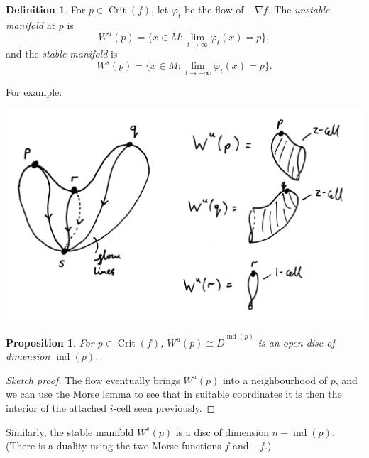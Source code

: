 \documentclass{article}
\newtheorem*{proposition}{Proposition}
\theoremstyle{definition}
\newtheorem*{definition}{Definition}
\DeclareMathOperator{\Crit}{Crit}
\DeclareMathOperator{\ind}{ind}
\begin{document}
\begin{definition}
    For $p\in\Crit(f)$, let $\varphi_t$ be the flow of $-\nabla f$. The
    \emph{unstable manifold} at $p$ is
    \begin{equation*}
        W^u(p) = \{x\in M:\lim_{t\to\infty}\varphi_t(x)=p\},
    \end{equation*}
    and the \emph{stable manifold} is
    \begin{equation*}
        W^s(p) = \{x\in M:\lim_{t\to-\infty}\varphi_t(x)=p\}.
    \end{equation*}
\end{definition}

For example:

\begin{center}
    \includegraphics[scale=0.1]{morse_unstable}
\end{center}

\begin{proposition}
    For $p\in\Crit(f)$, $W^u(p)\cong\mathring D^{\ind(p)}$ is an open disc of
    dimension $\ind(p)$.
\end{proposition}

\begin{proof}[Sketch proof]
    The flow eventually brings $W^u(p)$ into a neighbourhood of $p$, and we can
    use the Morse lemma to see that in suitable coordinates it is then the
    interior of the attached $i$-cell seen previously.
\end{proof}

Similarly, the stable manifold $W^s(p)$ is a disc of dimension $n-\ind(p)$.
(There is a duality using the two Morse functions $f$ and $-f$.)
\end{document}
